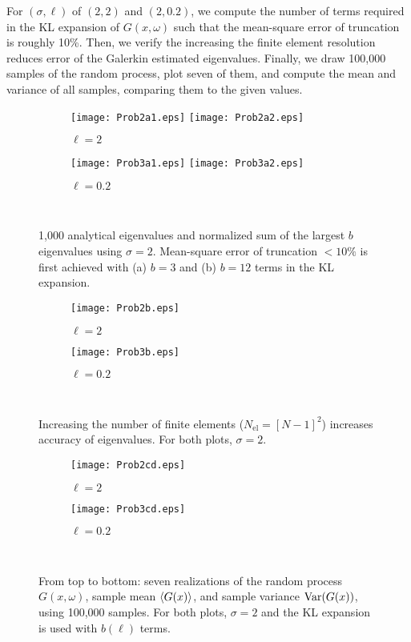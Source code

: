 \documentclass[11pt]{article}
\begin{document}
For $(\sigma, \ell)$ of $(2,2)$ and $(2,0.2)$, we compute the number of terms required in the KL expansion of $G(x,\omega)$ such that the mean-square error of truncation is roughly 10\%. Then, we verify the increasing the finite element resolution reduces error of the Galerkin estimated eigenvalues. Finally, we draw 100,000 samples of the random process, plot seven of them, and compute the mean and variance of all samples, comparing them to the given values.

\begin{figure}
\centering
\begin{subfigure}{0.49\textwidth}
\texttt{[image: Prob2a1.eps]}
\texttt{[image: Prob2a2.eps]}
\caption{$\ell=2$}
\end{subfigure}
\begin{subfigure}{0.49\textwidth}
\texttt{[image: Prob3a1.eps]}
\texttt{[image: Prob3a2.eps]}
\caption{$\ell=0.2$}
\end{subfigure}
\\[0.2cm]
\caption{1,000 analytical eigenvalues and normalized sum of the largest $b$ eigenvalues using $\sigma = 2$. Mean-square error of truncation $<10\%$ is first achieved with (a) $b=3$ and (b) $b=12$ terms in the KL expansion.}
\label{fig:analytical_eigs}
\end{figure}

\begin{figure}
\centering
\begin{subfigure}{0.49\textwidth}
\texttt{[image: Prob2b.eps]}
\caption{$\ell=2$}
\end{subfigure}
\begin{subfigure}{0.49\textwidth}
\texttt{[image: Prob3b.eps]}
\caption{$\ell=0.2$}
\end{subfigure}
\\[0.2cm]
\caption{Increasing the number of finite elements ($N_\text{el}=[N-1]^2$) increases accuracy of eigenvalues. For both plots, $\sigma=2$.}
\label{fig:error_reduction}
\end{figure}

\begin{figure}
\centering
\begin{subfigure}{0.49\textwidth}
\texttt{[image: Prob2cd.eps]}
\caption{$\ell=2$}
\end{subfigure}
\begin{subfigure}{0.49\textwidth}
\texttt{[image: Prob3cd.eps]}
\caption{$\ell=0.2$}
\end{subfigure}
\\[0.2cm]
\caption{From top to bottom: seven realizations of the random process $G(x,\omega)$, sample mean $\left\langle G(x) \right\rangle$, and sample variance $\operatorname{Var}(G(x))$, using 100,000 samples. For both plots, $\sigma=2$ and the KL expansion is used with $b(\ell)$ terms.}
\label{fig:realizations}
\end{figure}
\end{document}
